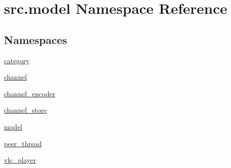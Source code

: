 \hypertarget{namespacesrc_1_1model}{}\section{src.\+model Namespace Reference}
\label{namespacesrc_1_1model}
\subsection*{Namespaces}
\begin{DoxyCompactItemize}
\item 
 \hyperlink{namespacesrc_1_1model_1_1category}{category}
\item 
 \hyperlink{namespacesrc_1_1model_1_1channel}{channel}
\item 
 \hyperlink{namespacesrc_1_1model_1_1channel__encoder}{channel\+\_\+encoder}
\item 
 \hyperlink{namespacesrc_1_1model_1_1channel__store}{channel\+\_\+store}
\item 
 \hyperlink{namespacesrc_1_1model_1_1model}{model}
\item 
 \hyperlink{namespacesrc_1_1model_1_1peer__thread}{peer\+\_\+thread}
\item 
 \hyperlink{namespacesrc_1_1model_1_1vlc__player}{vlc\+\_\+player}
\end{DoxyCompactItemize}
